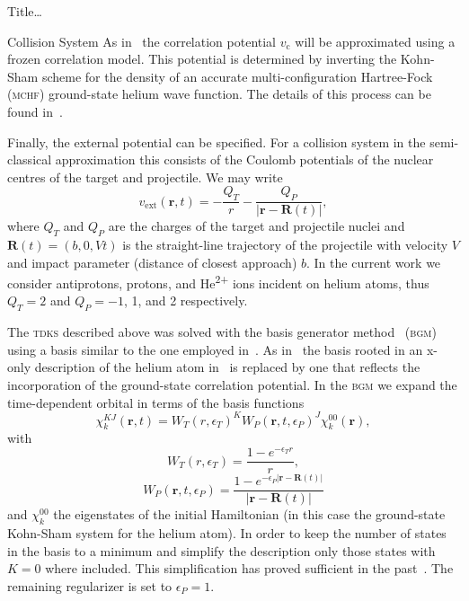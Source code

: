 \documentclass[letterpaper, 11 pt]{report}
\begin{document}
\begin{chapter}{ Title\dots \label{chap:p-he2p-he}}
\begin{section}{Collision System \label{sec:p-he2p-he-sys}}
      As in~\cite{pbarhe} the correlation potential $v_\mathrm{c}$ will be approximated using a frozen
      correlation model. This potential is determined by inverting the Kohn-Sham scheme for the density
      of an accurate multi-configuration Hartree-Fock~\cite{mchf} (\textsc{mchf}) ground-state helium
      wave function. The details of this process can be found in~\cite{thesis, pbarhe}.

      Finally, the external potential can be specified. For a collision system in the semi-classical
      approximation this consists of the Coulomb potentials of the nuclear centres of the target and
      projectile. We may write
      \begin{equation} \label{eq:phe2p-ext}
         v_\mathrm{ext}(\mathbf{r},t) = -\frac{Q_T}{r} 
         - \frac{Q_P}{\left| \mathbf{r} - \mathbf{R}(t) \right|},
      \end{equation}
      where $Q_T$ and $Q_P$ are the charges of the target and projectile nuclei and
      $\mathbf{R}(t) = (b,0,V t)$ is the straight-line trajectory of the projectile with velocity $V$ and
      impact parameter (distance of closest approach) $b$. In the current work we consider antiprotons,
      protons, and He\textsuperscript{2+} ions incident on helium atoms, thus $Q_T = 2$ and
      $Q_P = -1$, 1, and 2 respectively.

      The \textsc{tdks} described above was solved with the basis generator method~\cite{bgm}
      (\textsc{bgm}) using a basis similar to the one employed in~\cite{keim-ihe}. As in~\cite{pbarhe}
      the basis rooted in an x-only description of the helium atom in~\cite{keim-ihe} is replaced by one
      that reflects the incorporation of the ground-state correlation potential. In the \textsc{bgm} we
      expand the time-dependent orbital in terms of the basis functions
      \begin{equation} \label{eq:bgmbasis}
         \chi^{KJ}_k (\mathbf{r},t)
         = W_T(r,\epsilon_T)^K W_P( \mathbf{r},t, \epsilon_P)^J \chi^{00}_k (\mathbf{r}),
      \end{equation}
      with
      \begin{equation}
         W_T(r,\epsilon_T) = \frac{1 - e^{-\epsilon_T r}}{r},
      \end{equation}
      \begin{equation}
         W_P (\mathbf{r},t,\epsilon_P)
         = \frac{1 - e^{-\epsilon_P|\mathbf{r} - \mathbf{R}(t)|}}{|\mathbf{r} - \mathbf{R}(t)|}
      \end{equation}
      and $\chi^{00}_k$ the eigenstates of the initial Hamiltonian (in this case the ground-state
      Kohn-Sham system for the helium atom). In order to keep the number of states in the basis to a
      minimum and simplify the description only those states with $K = 0$ where included. This
      simplification has proved sufficient in the past~\cite{bgm-rev}. The remaining regularizer is set
      to $\epsilon_P = 1$.


\end{section}
\end{chapter}
\end{document}
